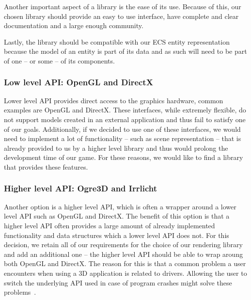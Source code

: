 Another important aspect of a library is the ease of its use. Because of this, our chosen library should provide an easy to use
interface, have complete and clear documentation and a large enough community.

Lastly, the library should be compatible with our ECS entity representation because the model of an entity is part of its data and
as such will need to be part of one -- or some -- of its components.

\subsubsection{Low level API: OpenGL and DirectX}

Lower level API provides direct access to the graphics hardware, common examples are OpenGL and DirectX. These interfaces, while
extremely flexible, do not support models created in an external application and thus fail to satisfy one of our goals. Additionally,
if we decided to use one of these interfaces, we would need to implement a lot of functionality -- such as scene representation -- that 
is already provided to us by a higher level library and thus would prolong the development time of our game. For these reasons, we would
like to find a library that provides these features.

\subsubsection{Higher level API: Ogre3D and Irrlicht}

Another option is a higher level API, which is often a wrapper around
a lower level API such as OpenGL and DirectX. The benefit of this option is that a higher level API often provides a large amount
of already implemented functionality and data structures which a lower level API does not. For this decision, we retain all of our
requirements for the choice of our rendering
library and add an additional one -- the higher level API should be able to wrap aroung both OpenGL and DirectX. The reason for this is
that a common problem a user encounters when using a 3D application is related to drivers. Allowing the user to switch the underlying
API used in case of program crashes might solve these problems~\cite{BothOpenGLAndDirectX}.

